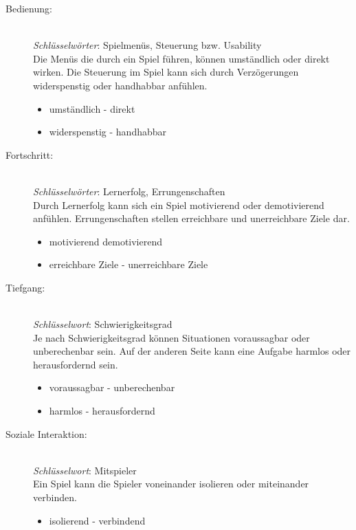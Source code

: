 \begin{description}
\item[Bedienung:] \ \\
\textit{Schlüsselwörter}: Spielmenüs, Steuerung bzw. Usability \\
Die Menüs die durch ein Spiel führen, können umständlich oder direkt wirken. Die Steuerung im Spiel kann sich durch Verzögerungen widerspenstig oder handhabbar anfühlen.
    \begin{itemize}
        \item umständlich - direkt%
        \item widerspenstig - handhabbar
    \end{itemize}
\item[Fortschritt:] \ \\
\textit{Schlüsselwörter}: Lernerfolg, Errungenschaften \\
Durch Lernerfolg kann sich ein Spiel motivierend oder demotivierend anfühlen. Errungenschaften stellen erreichbare und unerreichbare Ziele dar.
    \begin{itemize}
        \item motivierend demotivierend %
        \item erreichbare Ziele - unerreichbare Ziele 
    \end{itemize}
\item[Tiefgang:] \ \\
\textit{Schlüsselwort}: Schwierigkeitsgrad \\
Je nach Schwierigkeitsgrad können Situationen voraussagbar oder unberechenbar sein. Auf der anderen Seite kann eine Aufgabe harmlos oder herausfordernd sein.
    \begin{itemize}
        \item voraussagbar - unberechenbar %
        \item harmlos - herausfordernd 
    \end{itemize}
\item[Soziale Interaktion:] \ \\
\textit{Schlüsselwort}: Mitspieler \\
Ein Spiel kann die Spieler voneinander isolieren oder miteinander verbinden.
    \begin{itemize}
        \item isolierend - verbindend
    \end{itemize}
    


\end{description}




